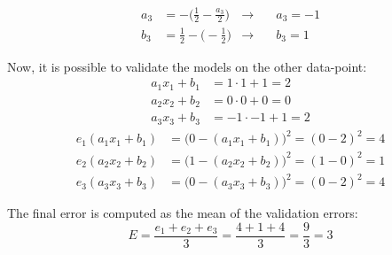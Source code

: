 {\begin{itemize}
		\begin{align*}
		a_3 &= - \bigg(\frac{1}{2} - \frac{a_3}{2}\bigg) &\rightarrow &\quad 
		a_3 = -1\\
		b_3 &= \frac{1}{2} -\bigg(-\frac{1}{2}\bigg) &\rightarrow& \quad b_3 = 1
		\end{align*}
		
		Now, it is possible to validate the models on the other data-point:
		\begin{align*}
		a_1x_1+b_1 & =  1 \cdot 1 + 1 = 2   \\
		a_2x_2+b_2 & =  0 \cdot 0 + 0 = 0   \\
		a_3x_3+b_3 & = -1 \cdot -1 + 1 = 2
		\end{align*}
		\begin{align*}
		e_1(a_1x_1+b_1) & = \big(0-(a_1x_1+b_1)\big)^2 = (0-2)^2 = 4\\
		e_2(a_2x_2+b_2) & = \big(1-(a_2x_2+b_2)\big)^2 = (1-0)^2 = 1\\
		e_3(a_3x_3+b_3) & = \big(0-(a_3x_3+b_3)\big)^2 = (0-2)^2 = 4
		\end{align*}
		
		The final error is computed as the mean of the validation errors: 
		\begin{equation*}
		E=\frac{e_1+e_2+e_3}{3}=\frac{4+1+4}{3}=\frac{9}{3}=3
		\end{equation*}
		
	\end{itemize}
}